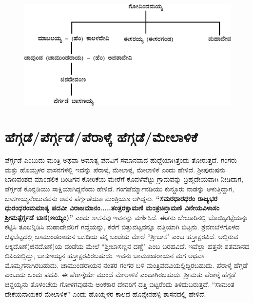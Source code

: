 \begin{figure}[H]
\includegraphics[scale=.98]{images/chap3/chap3fig1.jpeg}
\end{figure}


\section{ಹೆಗ್ಗಡೆ/ಪೆರ್ಗ್ಗಡೆ/ಪೆರಾಳ್ಕೆ ಹೆಗ್ಗಡೆ/ಮೇಲಾಳಿಕೆ}

ಪೆರ್ಗ್ಗಡೆ ಎಂಬುದು ಮಂತ್ರಿ ಅಥವಾ ಅಮಾತ್ಯ ಪದವಿಗೆ ಸಮಾನವಾದ ಹುದ್ದೆಯಾಗಿತ್ತೆಂದು ತೋರುತ್ತದೆ. ಗಂಗರು ಮತ್ತು ಹೊಯ್ಸಳರ ಶಾಸನಗಳಲ್ಲಿ ಇದನ್ನು ಪೆರಾಳ್ಕೆ, ಮೇಲಾಳ್ಕೆ, ಮೇಲಾಳಿಕೆ ಎಂದು ಹೇಳಿದೆ. ಶ‍್ರೀಪುರುಷನು ಬಾಣವಂಶದ ಮಾಂಡಲಿಕ ದಿಂಡಿಗನ ಕೋರಿಕೆಯ ಮೇರೆಗೆ ಕೊವಳೆವೆಟ್ಟು ಗ್ರಾಮವನ್ನು ಬ್ರಹ್ಮದೇಯವಾಗಿ ನೀಡಿದಾಗ, ಪೆರ್ಗ್ಗಡೆ ಕೊನ್ದಡಿಯು ಸಾಕ್ಷಿಯಾಗಿದ್ದನೆಂದು ಹೇಳಿದೆ. ಗಂಗಪೆರ್ಮ್ಮಾನಡಿಯು ಕುನ್ದೂರು ನಾಡನ್ನು ಆಳುತ್ತಿದ್ದಾಗ, ಬಾಸಣಯ್ಯನೆಂಬುವವನು ಅವನ ಪೆರ್ಗ್ಗಡೆಯೂ ಮಂತ್ರಿಯೂ ಆಗಿದ್ದನು.\textbf{ “ಸಮರಧಾರಧರಂ ರಾಜ್ಯಭರ ಧುರಂಧರಂಮಮಾತ್ಯ ಪದವೀ ವಿರಾಜಮಾನಂ.....ತಂತ್ರರಕ್ಷಾಮಣಿ ಮಂತ್ರಚಿನ್ತಾಮಣಿ ವಿನೇಯವಿಳಾಸಂ ಶ‍್ರೀಮತ್ಪೆರ್ಗ್ಗಡೆ ಬಾಸ(ಣಯ್ಯಂ)” }ಎಂದು ಶಾಸನವು ಇವನನ್ನು ವರ್ಣಿಸಿದೆ. ಈತನು ಬೇಲೂರಿನಲ್ಲಿ ಬೊಯ್ಸಿಕಟ್ಟೆಯನ್ನು ಕಟ್ಟಿಸಿ ತೂಬನ್ನಿಡಿಸಿ ಮಹಾದೇವರಿಗೆ ಗದ್ದೆಯನ್ನು, ಕೆರೆಗೆ ಬಿತ್ತುವಟ್ಟವನ್ನೂ ದತ್ತಿಯಾಗಿ ಬಿಟ್ಟನು. ಶ್ರವಣಬೆಳಗೊಳದ ಚಿಕ್ಕಬೆಟ್ಟದಲ್ಲಿ ಚಾಮುಂಡರಾಯನ ಬಸದಿಯ ಪಕ್ಕ ಬಂಡೆಯ ಮೇಲೆ “ಶ‍್ರೀಬಾಸ" ಎಂಬ ಹಸ್ತಾಕ್ಷರವಿದೆ. ಅಲ್ಲಿರುವ ಲಕ್ಕಿದೊಣೆ(ಜಿನದೊಣೆ)ಯ ದಂಡೆಯ ಮೇಲೆ “ಶ‍್ರೀಬಾಸಣ್ಣನ ದಣ್ಡೆ" ಎಂಬ ಬರಹವಿದೆ. ಇವೆಲ್ಲಾ ಹತ್ತನೇ ಶತಮಾನದ ಲಿಪಿಯಲ್ಲಿದ್ದು, ಬಾಸಣಯ್ಯನ ಹಸ್ತಾಕ್ಷರವಿರಬಹುದು. ಇವನು ಚಾಮುಂಡರಾಯನ ಮಗ ಅಥವಾ ಮೊಮ್ಮಗನಾಗಿರಬಹುದು. ಚಾಮುಂಡರಾಯನ ನಂತರ ಗಂಗರ ಬಳಿ ಮಂತ್ರಿಪದವಿ\-ಯಲ್ಲಿದ್ದಿರಬಹುದು. ಪೆರಾಳ್ಕೆ ಹೆಗ್ಗಡೆ ಎಂಬುದು ಒಂದು ಪದವಿ. ಈ ಪೆರಾಳ್ಕೆಯೇ ಮುಂದೆ ಮೇಲಾಳಿಕೆ ಎಂದಾಗಿರಬಹುದು. ಶ‍್ರೀಮತು ಪೆರಾಳ್ಕೆ ಹೆಗ್ಗಡೆ ಚನ್ದಯ್ಯನು ತೊಳಂಚೆಯ ಗೋಳಗವುಡನು ಅಂಕಕಾರ ದೇವರಿಗೆ ದತ್ತಿ ಬಿಟ್ಟರೆಂದು ತಿಳಿದುಬರುತ್ತದೆ. “ಸಾಮಂತ ದೇಕೆಯನಾಯಕರ ಮೇಲಾಳಿಕೆ” ಎಂದು ಹೊಯ್ಸಳರ ಕಾಲದ ಹೊನ್ನೇನಹಳ್ಳಿ ಶಾಸನದಲ್ಲಿ ಹೇಳಿದೆ.


